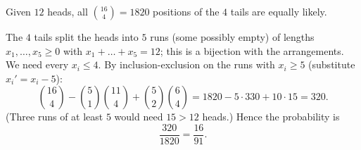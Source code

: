 Given $12$ heads, all $\binom{16}{4}=1820$ positions of the $4$ tails are equally likely.

The $4$ tails split the heads into $5$ runs (some possibly empty) of lengths $x_1,\dots,x_5\ge0$ with $x_1+\dots+x_5=12$; this is a bijection with the arrangements. We need every $x_i\le4$. By inclusion-exclusion on the runs with $x_i\ge5$ (substitute $x_i'=x_i-5$):
\[
\binom{16}{4}-\binom51\binom{11}{4}+\binom52\binom64=1820-5\cdot330+10\cdot15=320.
\]
(Three runs of at least $5$ would need $15>12$ heads.) Hence the probability is
\[\dfrac{320}{1820}=\boxed{\dfrac{16}{91}}.\]
